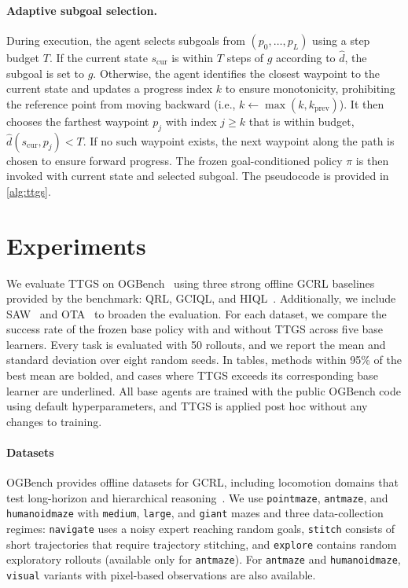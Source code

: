 \documentclass{article} %
\begin{document}
\paragraph{Adaptive subgoal selection.}
During execution, the agent selects subgoals from $(p_0,\dots,p_L)$ using a step budget $T$. If the current state $s_{\text{cur}}$ is within $T$ steps of $g$ according to $\hat d$, the subgoal is set to $g$. Otherwise, the agent identifies the closest waypoint to the current state and updates a progress index $k$ to ensure monotonicity, prohibiting the reference point from moving backward (i.e., $k \leftarrow \max(k, k_{\text{prev}})$). It then chooses the farthest waypoint $p_j$ with index $j \ge k$ that is within budget, $\hat d(s_{\text{cur}}, p_j)<T$. If no such waypoint exists, the next waypoint along the path is chosen to ensure forward progress. The frozen goal-conditioned policy $\pi$ is then invoked with current state and selected subgoal. The pseudocode is provided in \autoref{alg:ttgs}.

\section{Experiments}\label{sec:experiments}

We evaluate TTGS on OGBench~\citep{ogbench_park2025} using three strong offline GCRL baselines provided by the benchmark: QRL, GCIQL, and HIQL~\citep{tongzhouw2023qrl,park2024hiqlofflinegoalconditionedrl}. Additionally, we include SAW~\citep{zhou2025flattening} and OTA~\citep{ota2025} to broaden the evaluation. For each dataset, we compare the success rate of the frozen base policy with and without TTGS across five base learners. Every task is evaluated with 50 rollouts, and we report the mean and standard deviation over eight random seeds. In tables, methods within 95\% of the best mean are bolded, and cases where TTGS exceeds its corresponding base learner are underlined. All base agents are trained with the public OGBench code using default hyperparameters, and TTGS is applied post hoc without any changes to training.

\paragraph{Datasets}
OGBench provides offline datasets for GCRL, including locomotion domains that test long-horizon and hierarchical reasoning~\citep{ogbench_park2025}. We use \texttt{pointmaze}, \texttt{antmaze}, and \texttt{humanoidmaze} with \texttt{medium}, \texttt{large}, and \texttt{giant} mazes and three data-collection regimes: \texttt{navigate} uses a noisy expert reaching random goals, \texttt{stitch} consists of short trajectories that require trajectory stitching, and \texttt{explore} contains random exploratory rollouts (available only for \texttt{antmaze}). For \texttt{antmaze} and \texttt{humanoidmaze}, \texttt{visual} variants with pixel-based observations are also available.
\end{document}
